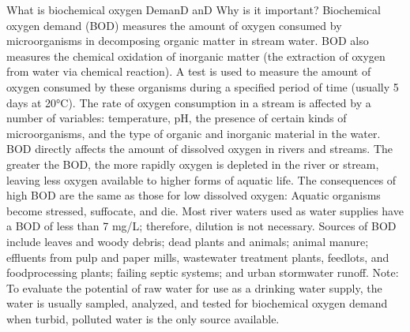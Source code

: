 \documentclass{article}
\begin{document}
What is biochemical oxygen DemanD anD Why is it important? Biochemical
oxygen demand (BOD) measures the amount of oxygen consumed by
microorganisms in decomposing organic matter in stream water. BOD also
measures the chemical oxidation of inorganic matter (the extraction of
oxygen from water via chemical reaction). A test is used to measure the
amount of oxygen consumed by these organisms during a specified period
of time (usually 5 days at 20°C). The rate of oxygen consumption in a
stream is affected by a number of variables: temperature, pH, the
presence of certain kinds of microorganisms, and the type of organic and
inorganic material in the water. BOD directly affects the amount of
dissolved oxygen in rivers and streams. The greater the BOD, the more
rapidly oxygen is depleted in the river or stream, leaving less oxygen
available to higher forms of aquatic life. The consequences of high BOD
are the same as those for low dissolved oxygen: Aquatic organisms become
stressed, suffocate, and die. Most river waters used as water supplies
have a BOD of less than 7 mg/L; therefore, dilution is not necessary.
Sources of BOD include leaves and woody debris; dead plants and animals;
animal manure; effluents from pulp and paper mills, wastewater treatment
plants, feedlots, and foodprocessing plants; failing septic systems; and
urban stormwater runoff. Note: To evaluate the potential of raw water
for use as a drinking water supply, the water is usually sampled,
analyzed, and tested for biochemical oxygen demand when turbid, polluted
water is the only source available.
\end{document}
